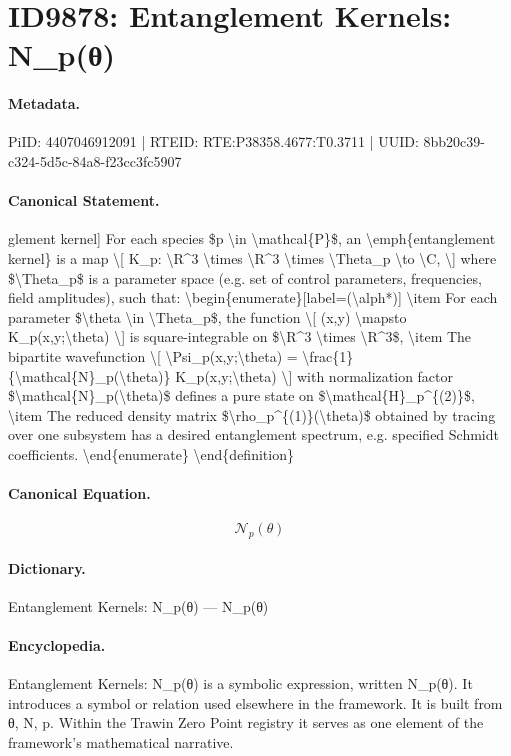 \section*{ID9878: Entanglement Kernels: N\_p(θ)}
\paragraph{Metadata.}
PiID: 4407046912091 | RTEID: RTE:P38358.4677:T0.3711 | UUID: 8bb20c39-c324-5d5c-84a8-f23cc3fc5907

\paragraph{Canonical Statement.}
glement kernel] For each species \$p \textbackslash{}in \textbackslash{}mathcal\{P\}\$, an \textbackslash{}emph\{entanglement kernel\} is a map \textbackslash{}[ K\_p: \textbackslash{}R\textasciicircum{}3 \textbackslash{}times \textbackslash{}R\textasciicircum{}3 \textbackslash{}times \textbackslash{}Theta\_p \textbackslash{}to \textbackslash{}C, \textbackslash{}] where \$\textbackslash{}Theta\_p\$ is a parameter space (e.g. set of control parameters, frequencies, field amplitudes), such that: \textbackslash{}begin\{enumerate\}[label=(\textbackslash{}alph*)] \textbackslash{}item For each parameter \$\textbackslash{}theta \textbackslash{}in \textbackslash{}Theta\_p\$, the function \textbackslash{}[ (x,y) \textbackslash{}mapsto K\_p(x,y;\textbackslash{}theta) \textbackslash{}] is square-integrable on \$\textbackslash{}R\textasciicircum{}3 \textbackslash{}times \textbackslash{}R\textasciicircum{}3\$, \textbackslash{}item The bipartite wavefunction \textbackslash{}[ \textbackslash{}Psi\_p(x,y;\textbackslash{}theta) = \textbackslash{}frac\{1\}\{\textbackslash{}mathcal\{N\}\_p(\textbackslash{}theta)\} K\_p(x,y;\textbackslash{}theta) \textbackslash{}] with normalization factor \$\textbackslash{}mathcal\{N\}\_p(\textbackslash{}theta)\$ defines a pure state on \$\textbackslash{}mathcal\{H\}\_p\textasciicircum{}\{(2)\}\$, \textbackslash{}item The reduced density matrix \$\textbackslash{}rho\_p\textasciicircum{}\{(1)\}(\textbackslash{}theta)\$ obtained by tracing over one subsystem has a desired entanglement spectrum, e.g. specified Schmidt coefficients. \textbackslash{}end\{enumerate\} \textbackslash{}end\{definition\}

\paragraph{Canonical Equation.}
\[
\mathcal{N}_p(\theta)
\]

\paragraph{Dictionary.}
Entanglement Kernels: N\_p(θ) — N\_p(θ)

\paragraph{Encyclopedia.}
Entanglement Kernels: N\_p(θ) is a symbolic expression, written N\_p(θ). It introduces a symbol or relation used elsewhere in the framework. It is built from θ, N, p. Within the Trawin Zero Point registry it serves as one element of the framework's mathematical narrative.
